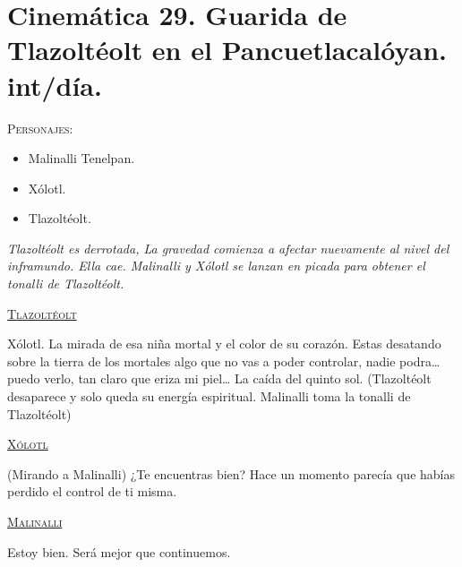 \section{Cinemática 29. Guarida de Tlazoltéolt en el Pancuetlacalóyan. int/día.}  \label{Cin:Cinematica29}
 \textsc{Personajes}:
 \begin{itemize}
 \item Malinalli Tenelpan.
\item Xólotl.
\item Tlazoltéolt.
 \end{itemize}
\textit{Tlazoltéolt es derrotada, La gravedad comienza a afectar nuevamente al nivel del inframundo. Ella cae. Malinalli y Xólotl se lanzan en picada para obtener el tonalli de Tlazoltéolt.}
\begin{center}
\textsc{\underline{Tlazoltéolt}}
\\
\par
Xólotl. La mirada de esa niña mortal y el color de su corazón. Estas desatando sobre la tierra de los mortales algo que no vas a poder controlar, nadie podra… puedo verlo, tan claro que eriza mi piel… La caída del quinto sol. (Tlazoltéolt desaparece y solo queda su energía espiritual. Malinalli toma la tonalli de Tlazoltéolt) 
\\
\par
\textsc{\underline{Xólotl}}
\\
\par
(Mirando a Malinalli) ¿Te encuentras bien? Hace un momento parecía que habías perdido el control de ti misma.
\\
\par
\textsc{\underline{Malinalli}}
\\
\par
Estoy bien. Será mejor que continuemos.
\end{center}
